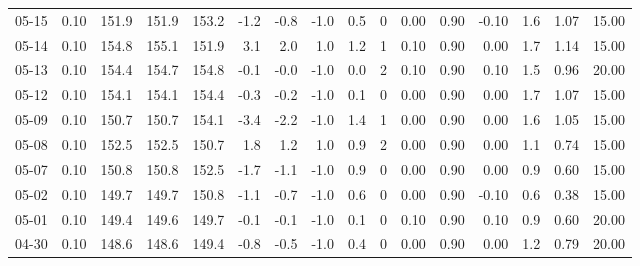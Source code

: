 \begin{threeparttable}
{\begin{tabular}{lrrrrrrrrrrrrrrr}
  05-15 &     0.10 & 151.9 & 151.9 & 153.2 &       -1.2 &           -0.8 &                     -1.0 &                 0.5 &              0 &       0.00 &      0.90 &          -0.10 &              1.6 &            1.07 &                  15.00 \\
  05-14 &     0.10 & 154.8 & 155.1 & 151.9 &        3.1 &            2.0 &                      1.0 &                 1.2 &              1 &       0.10 &      0.90 &           0.00 &              1.7 &            1.14 &                  15.00 \\
  05-13 &     0.10 & 154.4 & 154.7 & 154.8 &       -0.1 &           -0.0 &                     -1.0 &                 0.0 &              2 &       0.10 &      0.90 &           0.10 &              1.5 &            0.96 &                  20.00 \\
  05-12 &     0.10 & 154.1 & 154.1 & 154.4 &       -0.3 &           -0.2 &                     -1.0 &                 0.1 &              0 &       0.00 &      0.90 &           0.00 &              1.7 &            1.07 &                  15.00 \\
  05-09 &     0.10 & 150.7 & 150.7 & 154.1 &       -3.4 &           -2.2 &                     -1.0 &                 1.4 &              1 &       0.00 &      0.90 &           0.00 &              1.6 &            1.05 &                  15.00 \\
  05-08 &     0.10 & 152.5 & 152.5 & 150.7 &        1.8 &            1.2 &                      1.0 &                 0.9 &              2 &       0.00 &      0.90 &           0.00 &              1.1 &            0.74 &                  15.00 \\
  05-07 &     0.10 & 150.8 & 150.8 & 152.5 &       -1.7 &           -1.1 &                     -1.0 &                 0.9 &              0 &       0.00 &      0.90 &           0.00 &              0.9 &            0.60 &                  15.00 \\
  05-02 &     0.10 & 149.7 & 149.7 & 150.8 &       -1.1 &           -0.7 &                     -1.0 &                 0.6 &              0 &       0.00 &      0.90 &          -0.10 &              0.6 &            0.38 &                  15.00 \\
  05-01 &     0.10 & 149.4 & 149.6 & 149.7 &       -0.1 &           -0.1 &                     -1.0 &                 0.1 &              0 &       0.10 &      0.90 &           0.10 &              0.9 &            0.60 &                  20.00 \\
  04-30 &     0.10 & 148.6 & 148.6 & 149.4 &       -0.8 &           -0.5 &                     -1.0 &                 0.4 &              0 &       0.00 &      0.90 &           0.00 &              1.2 &            0.79 &                  20.00 \\

\end{tabular}}
\end{threeparttable}
